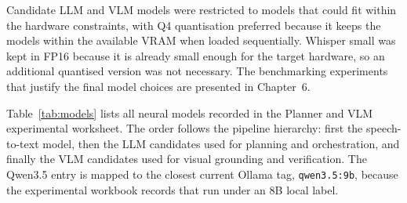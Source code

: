 Candidate LLM and VLM models were restricted to models that could fit within the hardware constraints, with Q4 quantisation preferred because it keeps the models within the available VRAM when loaded sequentially. Whisper small was kept in FP16 because it is already small enough for the target hardware, so an additional quantised version was not necessary. The benchmarking experiments that justify the final model choices are presented in Chapter~6.

Table~\ref{tab:models} lists all neural models recorded in the Planner and VLM experimental worksheet. The order follows the pipeline hierarchy: first the speech-to-text model, then the LLM candidates used for planning and orchestration, and finally the VLM candidates used for visual grounding and verification. The Qwen3.5 entry is mapped to the closest current Ollama tag, \texttt{qwen3.5:9b}, because the experimental workbook records that run under an 8B local label.

